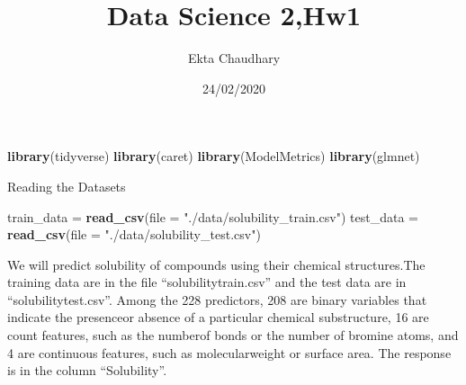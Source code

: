 \documentclass[]{article}
\title{Data Science 2,Hw1}
\author{Ekta Chaudhary}
\date{24/02/2020}
\newenvironment{Shaded}{\begin{snugshade}}{\end{snugshade}}
\newcommand{\CommentTok}[1]{\textcolor[rgb]{0.56,0.35,0.01}{\textit{#1}}}
\newcommand{\DataTypeTok}[1]{\textcolor[rgb]{0.13,0.29,0.53}{#1}}
\newcommand{\DecValTok}[1]{\textcolor[rgb]{0.00,0.00,0.81}{#1}}
\newcommand{\KeywordTok}[1]{\textcolor[rgb]{0.13,0.29,0.53}{\textbf{#1}}}
\newcommand{\NormalTok}[1]{#1}
\newcommand{\OperatorTok}[1]{\textcolor[rgb]{0.81,0.36,0.00}{\textbf{#1}}}
\newcommand{\StringTok}[1]{\textcolor[rgb]{0.31,0.60,0.02}{#1}}
\begin{document}
\maketitle

\begin{Shaded}
\begin{Highlighting}[]
\KeywordTok{library}\NormalTok{(tidyverse)}
\KeywordTok{library}\NormalTok{(caret)}
\KeywordTok{library}\NormalTok{(ModelMetrics)}
\KeywordTok{library}\NormalTok{(glmnet)}
\end{Highlighting}
\end{Shaded}

Reading the Datasets

\begin{Shaded}
\begin{Highlighting}[]
\NormalTok{train_data =}\StringTok{ }\KeywordTok{read_csv}\NormalTok{(}\DataTypeTok{file =} \StringTok{"./data/solubility_train.csv"}\NormalTok{)}
\NormalTok{test_data =}\StringTok{ }\KeywordTok{read_csv}\NormalTok{(}\DataTypeTok{file =} \StringTok{"./data/solubility_test.csv"}\NormalTok{)}
\end{Highlighting}
\end{Shaded}

We will predict solubility of compounds using their chemical
structures.The training data are in the file ``solubilitytrain.csv'' and
the test data are in ``solubilitytest.csv''. Among the 228 predictors,
208 are binary variables that indicate the presenceor absence of a
particular chemical substructure, 16 are count features, such as the
numberof bonds or the number of bromine atoms, and 4 are continuous
features, such as molecularweight or surface area. The response is in
the column ``Solubility''.

\begin{Shaded}
\end{Shaded}
\end{document}
